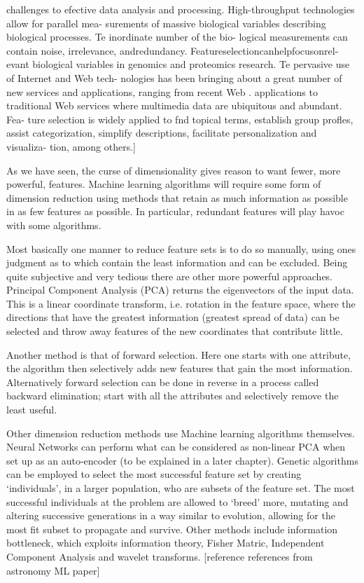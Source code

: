 challenges to efective data analysis and processing.
High-throughput technologies allow for parallel mea-
surements of massive biological variables describing
biological processes. 
Te inordinate number of the bio-
logical measurements can contain noise, irrelevance,
andredundancy.
Featureselectioncanhelpfocusonrel-
evant biological variables in genomics and proteomics
research. 
Te pervasive use of Internet and Web tech-
nologies has been bringing about a great number of
new services and applications, ranging from recent
Web . applications to traditional Web services where
multimedia data are ubiquitous and abundant. Fea-
ture selection is widely applied to fnd topical terms,
establish group profles, assist categorization, simplify
descriptions, facilitate personalization and visualiza-
tion, among others.]

As we have seen, the curse of dimensionality gives reason to want fewer, more powerful, features.
Machine learning algorithms will require some form of dimension reduction using methods that retain as much information as possible in as few features as possible.
In particular, redundant features will play havoc with some algorithms.

Most basically one manner to reduce feature sets is to do so manually, using ones judgment as to which contain the least information and can be excluded.
Being quite subjective and very tedious there are other more powerful approaches.
Principal Component Analysis (PCA)  returns the eigenvectors of the input data.
This is a linear coordinate transform, i.e. rotation in the feature space, where the directions that have the greatest information (greatest spread of data) can be selected and throw away features of the new coordinates that contribute little.

Another method is that of forward selection.
Here one starts with one attribute, the algorithm then selectively adds new features that gain the most information.
Alternatively forward selection can be done in reverse in a process called backward elimination; start with all the attributes and selectively remove the least useful.

Other dimension reduction methods use Machine learning algorithms themselves.
Neural Networks can perform what can be considered as non-linear PCA when set up as an auto-encoder (to be explained in a  later chapter).
Genetic algorithms can be employed to select the most successful feature set by creating `individuals', in a larger population, who are subsets of the feature set.
The most successful individuals at the problem are allowed to `breed' more, mutating and altering successive generations in a way similar to evolution, allowing for the most fit subset to propagate and survive.
Other methods include information bottleneck, which exploits information theory, Fisher Matric, Independent Component Analysis and wavelet transforms.
[reference references from astronomy ML paper]

